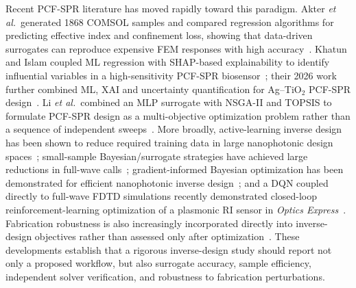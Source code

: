 \documentclass[5p,times,twocolumn]{elsarticle}
\newcommand{\etal}{\textit{et al.}}
\begin{document}
Recent PCF-SPR literature has moved rapidly toward this paradigm. Akter \etal~generated 1868 COMSOL samples and compared regression algorithms for predicting effective index and confinement loss, showing that data-driven surrogates can reproduce expensive FEM responses with high accuracy~\cite{Akter2025MLPCF}. Khatun and Islam coupled ML regression with SHAP-based explainability to identify influential variables in a high-sensitivity PCF-SPR biosensor~\cite{Khatun2025XAI}; their 2026 work further combined ML, XAI and uncertainty quantification for Ag--TiO$_2$ PCF-SPR design~\cite{Khatun2026MLXAI}. Li \etal~combined an MLP surrogate with NSGA-II and TOPSIS to formulate PCF-SPR design as a multi-objective optimization problem rather than a sequence of independent sweeps~\cite{Li2025MLMultiObjective}. More broadly, active-learning inverse design has been shown to reduce required training data in large nanophotonic design spaces~\cite{Singh2025ActiveLearning}; small-sample Bayesian/surrogate strategies have achieved large reductions in full-wave calls~\cite{Xie2026SmallSample}; gradient-informed Bayesian optimization has been demonstrated for efficient nanophotonic inverse design~\cite{Mahlau2026BONNI}; and a DQN coupled directly to full-wave FDTD simulations recently demonstrated closed-loop reinforcement-learning optimization of a plasmonic RI sensor in \textit{Optics Express}~\cite{Hossain2026DeepRL}. Fabrication robustness is also increasingly incorporated directly into inverse-design objectives rather than assessed only after optimization~\cite{Wang2025RobustID}. These developments establish that a rigorous inverse-design study should report not only a proposed workflow, but also surrogate accuracy, sample efficiency, independent solver verification, and robustness to fabrication perturbations.
\end{document}
